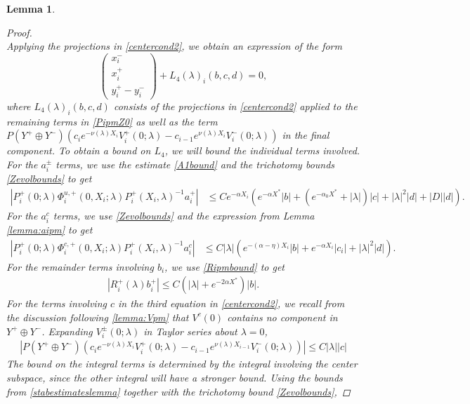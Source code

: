 \documentclass[10pt,reqno]{amsart}
\theoremstyle{plain}
\newtheorem{lemma}[theorem]{Lemma}
\theoremstyle{definition}
\theoremstyle{remark}
\numberwithin{theorem}{section}
\numberwithin{equation}{section}
\begin{document}
\begin{lemma}
\begin{proof}
\begin{equation}
\end{equation}
Applying the projections in \eqref{centercond2}, we obtain an expression of the form
\begin{equation}\label{projxy}
\begin{pmatrix}x_i^- \\ x_i^+ \\ 
y_i^+ - y_i^- \end{pmatrix} 
+ L_4(\lambda)_i(b, c, d) = 0,
\end{equation}
where $L_4(\lambda)_i(b, c, d)$ consists of the projections in \cref{centercond2} applied to the remaining terms in \cref{PipmZ0} as well as the term $P(Y^+ \oplus Y^-) ( c_i e^{-\nu(\lambda)X_i}V_i^+(0; \lambda) - c_{i-1} e^{\nu(\lambda)X_i} V_i^-(0; \lambda) )$ in the final component. To obtain a bound on $L_4$, we will bound the individual terms involved. For the $a_i^\pm$ terms, we use the estimate \cref{A1bound} and the trichotomy bounds \cref{Zevolbounds} to get
\begin{align*}
|P_i^+(0; \lambda) \Phi_i^{u,+}(0, X_i; \lambda) P_i^+(X_i, \lambda)^{-1} a_i^+| 
&\leq C e^{-\alpha X_i} \left( e^{-\alpha X^*} |b| + (e^{-\alpha_0 X^*} + |\lambda|)|c| + |\lambda|^2 |d| + |D||d| \right).
\end{align*}
For the $a_i^c$ terms, we use \cref{Zevolbounds} and the expression from Lemma \ref{lemma:aipm} to get
\begin{align*}
| P_i^+(0; \lambda) \Phi_i^{c,+}(0, X_i; \lambda) P_i^+(X_i, \lambda)^{-1} a_i^c | &\leq C |\lambda| \left( e^{-(\alpha-\eta) X_i} |b| + e^{-\alpha X_i} |c_i| +|\lambda|^2 |d| \right).
\end{align*}
For the remainder terms involving $b_i$, we use \cref{Ripmbound} to get
\begin{align*}
|R_i^+(\lambda) b_i^+|\leq C \left(|\lambda| + e^{-2 \alpha X^*}\right)|b|.
\end{align*}
For the terms involving $c$ in the third equation in \cref{centercond2}, we recall from the discussion following \cref{lemma:Vpm} that $V^c(0)$ contains no component in $Y^+ \oplus Y^-$. Expanding $V_i^\pm(0; \lambda)$ in Taylor series about $\lambda = 0$,
\begin{align*}
| P(Y^+ \oplus Y^-) ( c_i e^{-\nu(\lambda)X_i}V_i^+(0; \lambda) - c_{i-1} e^{\nu(\lambda)X_{i-1}} V_i^-(0; \lambda) ) | \leq C |\lambda| |c|
\end{align*}
The bound on the integral terms is determined by the integral involving the center subspace, since the other integral will have a stronger bound. Using the bounds from \cref{stabestimateslemma} together with the trichotomy bound \cref{Zevolbounds}, 

\end{proof}
\end{lemma}
\end{document}
